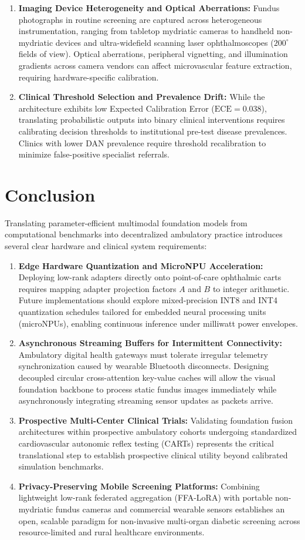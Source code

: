 \documentclass[journal,10pt,twocolumn]{IEEEtran}
\begin{document}
\begin{enumerate}
    \item \textbf{Imaging Device Heterogeneity and Optical Aberrations:} Fundus photographs in routine screening are captured across heterogeneous instrumentation, ranging from tabletop mydriatic cameras to handheld non-mydriatic devices and ultra-widefield scanning laser ophthalmoscopes ($200^\circ$ fields of view). Optical aberrations, peripheral vignetting, and illumination gradients across camera vendors can affect microvascular feature extraction, requiring hardware-specific calibration.
    \item \textbf{Clinical Threshold Selection and Prevalence Drift:} While the architecture exhibits low Expected Calibration Error ($\text{ECE}=0.038$), translating probabilistic outputs into binary clinical interventions requires calibrating decision thresholds to institutional pre-test disease prevalences. Clinics with lower DAN prevalence require threshold recalibration to minimize false-positive specialist referrals.
\end{enumerate}

\section{Conclusion}
\label{sec:conclusion}
Translating parameter-efficient multimodal foundation models from computational benchmarks into decentralized ambulatory practice introduces several clear hardware and clinical system requirements:
\begin{enumerate}
    \item \textbf{Edge Hardware Quantization and MicroNPU Acceleration:} Deploying low-rank adapters directly onto point-of-care ophthalmic carts requires mapping adapter projection factors $A$ and $B$ to integer arithmetic. Future implementations should explore mixed-precision INT8 and INT4 quantization schedules tailored for embedded neural processing units (microNPUs), enabling continuous inference under milliwatt power envelopes.
    \item \textbf{Asynchronous Streaming Buffers for Intermittent Connectivity:} Ambulatory digital health gateways must tolerate irregular telemetry synchronization caused by wearable Bluetooth disconnects. Designing decoupled circular cross-attention key-value caches will allow the visual foundation backbone to process static fundus images immediately while asynchronously integrating streaming sensor updates as packets arrive.
    \item \textbf{Prospective Multi-Center Clinical Trials:} Validating foundation fusion architectures within prospective ambulatory cohorts undergoing standardized cardiovascular autonomic reflex testing (CARTs) represents the critical translational step to establish prospective clinical utility beyond calibrated simulation benchmarks.
    \item \textbf{Privacy-Preserving Mobile Screening Platforms:} Combining lightweight low-rank federated aggregation (FFA-LoRA) with portable non-mydriatic fundus cameras and commercial wearable sensors establishes an open, scalable paradigm for non-invasive multi-organ diabetic screening across resource-limited and rural healthcare environments.
\end{enumerate}
\end{document}
